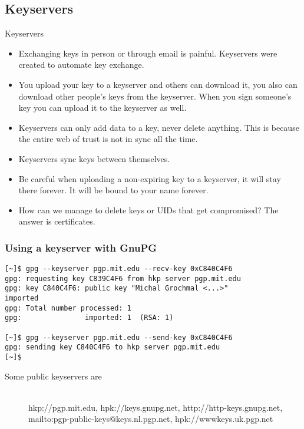 \documentclass[hyperref={colorlinks=true}]{beamer}
\begin{document}
\subsection{Keyservers}
\begin{frame}{Keyservers}
  \begin{itemize}
    \item Exchanging keys in person or through email is painful.  Keyservers
were created to automate key exchange.
    \item You upload your key to a keyserver and others can download it, you
also can download other people's keys from the keyserver.  When you sign
someone's key you can upload it to the keyserver as well.
    \item Keyservers can only add data to a key, never delete anything.  This
is because the entire web of trust is not in sync all the time.
    \item Keyservers sync keys between themselves.
    \item Be careful when uploading a non-expiring key to a keyserver, it will
stay there forever.  It will be bound to your name forever.
    \item How can we manage to delete keys or UIDs that get compromised?  The
answer is certificates.
  \end{itemize}
\end{frame}

\begin{frame}[fragile]\frametitle{Using a keyserver with GnuPG}
{\footnotesize
\begin{verbatim}
[~]$ gpg --keyserver pgp.mit.edu --recv-key 0xC840C4F6
gpg: requesting key C839C4F6 from hkp server pgp.mit.edu
gpg: key C840C4F6: public key "Michal Grochmal <...>"
imported
gpg: Total number processed: 1
gpg:               imported: 1  (RSA: 1)

[~]$ gpg --keyserver pgp.mit.edu --send-key 0xC840C4F6
gpg: sending key C840C4F6 to hkp server pgp.mit.edu
[~]$
\end{verbatim}
}
  \begin{description}
    \item[Some public keyservers are] \hfill \\
hkp://pgp.mit.edu, hpk://keys.gnupg.net, http://http-keys.gnupg.net,
mailto:pgp-public-keys@keys.nl.pgp.net, hpk://wwwkeys.uk.pgp.net
  \end{description}
\end{frame}
\end{document}
